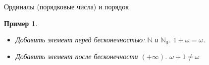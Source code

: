 \documentclass[aspectratio=169]{beamer}
\newtheorem{exm}{Пример}[section]
\begin{document}
\begin{frame}{Ординалы (порядковые числа) и порядок}
\begin{exm}\begin{itemize}
\item Добавить элемент перед бесконечностью: $\mathbb{N}$ и $\mathbb{N}_0$.
\pause
$1 + \omega = \omega$. \pause
\item Добавить элемент после бесконечности $(+\infty)$. \pause $\omega + 1 \ne \omega$ %
\end{itemize}\end{exm} 
\end{frame}
\end{document}
